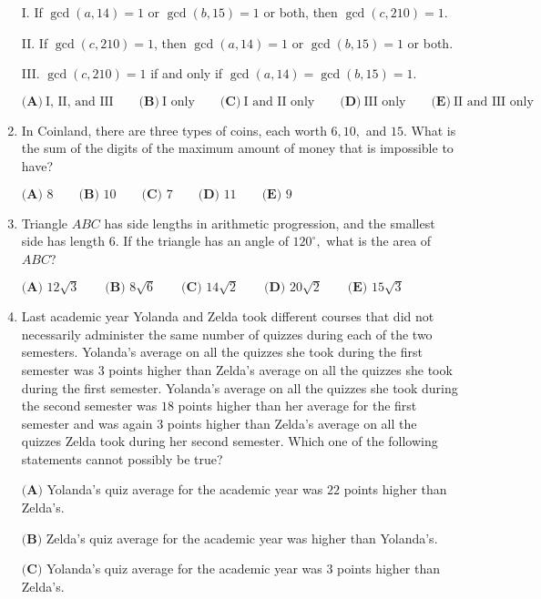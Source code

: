 \documentclass{article}
\begin{document}
\begin{enumerate}[label=\arabic*., itemsep=0.5em]
I. If \(\gcd(a,14)=1\) or \(\gcd(b,15)=1\) or both, then \(\gcd(c,210)=1\).

II. If \(\gcd(c,210)=1\), then \(\gcd(a,14)=1\) or \(\gcd(b,15)=1\) or both.

III. \(\gcd(c,210)=1\) if and only if \(\gcd(a,14)=\gcd(b,15)=1\).

\(\textbf{(A)}~\text{I, II, and III}\qquad\textbf{(B)}~\text{I only}\qquad\textbf{(C)}~\text{I and II only}\qquad\textbf{(D)}~\text{III only}\qquad\textbf{(E)}~\text{II and III only}\)\par \vspace{0.5em}\item In Coinland, there are three types of coins, each worth \(6, 10,\) and \(15.\) What is the sum of the digits of the maximum amount of money that is impossible to have?

\(\textbf{(A) }8\qquad\textbf{(B) }10\qquad\textbf{(C) }7\qquad\textbf{(D) }11\qquad\textbf{(E) }9\)\par \vspace{0.5em}\item Triangle \(ABC\) has side lengths in arithmetic progression, and the smallest side has length \(6\). If the triangle has an angle of \(120^\circ,\) what is the area of \(ABC\)?

\(\textbf{(A) }12\sqrt{3}\qquad\textbf{(B) }8\sqrt{6}\qquad\textbf{(C) }14\sqrt{2}\qquad\textbf{(D) }20\sqrt{2}\qquad\textbf{(E) }15\sqrt{3}\)\par \vspace{0.5em}\item Last academic year Yolanda and Zelda took different courses that did not necessarily administer the same number of quizzes during each of the two semesters. Yolanda's average on all the quizzes she took during the first semester was \(3\) points higher than Zelda's average on all the quizzes she took during the first semester. Yolanda's average on all the quizzes she took during the second semester was \(18\) points higher than her average for the first semester and was again \(3\) points higher than Zelda's average on all the quizzes Zelda took during her second semester. Which one of the following statements cannot possibly be true?

\(\textbf{(A)}\) Yolanda's quiz average for the academic year was \(22\) points higher than Zelda's.

\(\textbf{(B)}\) Zelda's quiz average for the academic year was higher than Yolanda's.

\(\textbf{(C)}\) Yolanda's quiz average for the academic year was \(3\) points higher than Zelda's.


\end{enumerate}
\end{document}
